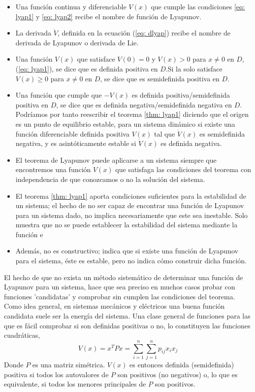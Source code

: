 \begin{itemize}
\item Una función continua y diferenciable $V(x)$ que cumple las condiciones \ref{eq: lyap1} y \ref{eq: lyap2} recibe el nombre de función de Lyapunov.
\item La derivada $\dot V$, definida en la ecuación (\ref{eq: dlyap}) recibe el nombre de derivada de Lyapunov o derivada de Lie.
\item Una función $V(x)$ que satisface $V(0)=0$ y $V(x)>0$ para $x\neq 0$ en $D$, (\ref{eq: lyap1}), se dice que es definida positiva en $D$.Si la solo satisface $V(x)\geq 0$ para $x\neq 0$ en $D$, se dice que es semidefinida positiva en $D$.
\item Una función que cumple que $-V(x)$ es definida positiva/semidefinida positiva en $D$, se dice que es definida negativa/semidefinida negativa en $D$. Podríamos por tanto reescribir el teorema \ref{thm: lyap1} diciendo que el origen es un punto de equilibrio estable, para un sistema dinámico si existe una función diferenciable definida positiva $V(x)$ tal que $\dot V(x)$ es semidefinida negativa, y es asintóticamente estable si $\dot V(x)$ es definida negativa.
\item El teorema de Lyapunov puede aplicarse a un sistema siempre que encontremos una función $V(x)$ que satisfaga las condiciones del teorema con independencia de que conozcamos o no la solución del sistema.
\item El teorema \ref{thm: lyap1} aporta condiciones suficientes para la estabilidad de un sistema; el hecho de no ser capaz de encontrar una función de Lyapunov para un sistema dado, no implica necesariamente que este sea inestable. Solo muestra que no se puede establecer la estabilidad del sistema mediante la función e
\item Además, no es constructivo; indica que si existe una función de Lyapunov para el sistema, éste es estable, pero no indica cómo construir dicha función. 
\end{itemize}

El hecho de que no exista un método sistemático de determinar una función de Lyapunov para un sistema, hace que sea preciso en muchos casos probar con funciones 'candidatas' y comprobar sin cumplen las condiciones del teorema. Como idea general, en sistemas mecánicos y eléctricos una buena función candidata suele ser la energía del sistema. Una clase general de funciones para las que es fácil comprobar si son definidas positivas o no, lo constituyen las funciones cuadráticas,
\begin{equation}
V(x) = x^TPx = \sum_{i=1}^n \sum_{j=1}^n p_{ij}x_ix_j
\end{equation}
Donde $P$ es una matriz simétrica. $V(x)$ es entonces definida (semidefinida) positiva si todos los autovalores de $P$ son positivos (no negativos) o, lo que es equivalente, si todos los menores principales de $P$ son positivos.

